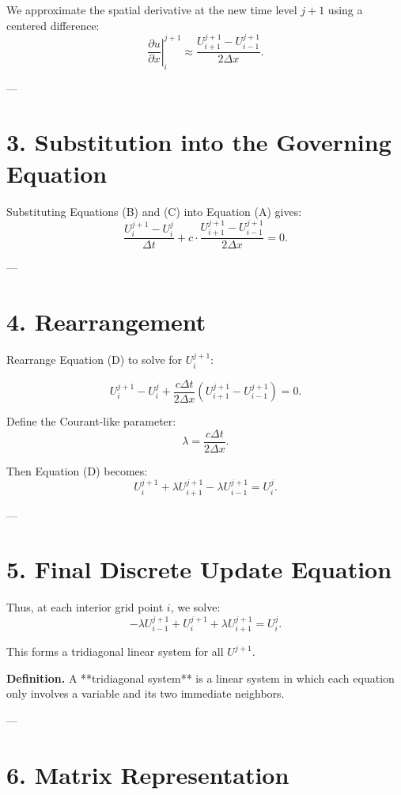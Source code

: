 \documentclass{article}
\begin{document}
We approximate the spatial derivative at the new time level $j+1$ using a centered difference:
\begin{equation}
\left. \frac{\partial u}{\partial x} \right|_i^{j+1} \approx \frac{U_{i+1}^{j+1} - U_{i-1}^{j+1}}{2 \Delta x}.
\tag{C}
\end{equation}

---

\section*{3. Substitution into the Governing Equation}

Substituting Equations (B) and (C) into Equation (A) gives:
\[
\frac{U_i^{j+1} - U_i^j}{\Delta t} + c \cdot \frac{U_{i+1}^{j+1} - U_{i-1}^{j+1}}{2 \Delta x} = 0.
\tag{D}
\]

---

\section*{4. Rearrangement}

Rearrange Equation (D) to solve for $U_i^{j+1}$:

\[
U_i^{j+1} - U_i^j + \frac{c \Delta t}{2 \Delta x} (U_{i+1}^{j+1} - U_{i-1}^{j+1}) = 0.
\]

Define the Courant-like parameter:
\[
\lambda = \frac{c \Delta t}{2 \Delta x}.
\tag{E}
\]

Then Equation (D) becomes:
\[
U_i^{j+1} + \lambda U_{i+1}^{j+1} - \lambda U_{i-1}^{j+1} = U_i^j.
\tag{F}
\]

---

\section*{5. Final Discrete Update Equation}

Thus, at each interior grid point $i$, we solve:
\[
-\lambda U_{i-1}^{j+1} + U_i^{j+1} + \lambda U_{i+1}^{j+1} = U_i^j.
\tag{G}
\]

This forms a tridiagonal linear system for all $U^{j+1}$.

\vspace{0.5em}
\noindent\textbf{Definition.}  
A **tridiagonal system** is a linear system in which each equation only involves a variable and its two immediate neighbors.

---

\section*{6. Matrix Representation}
\end{document}
